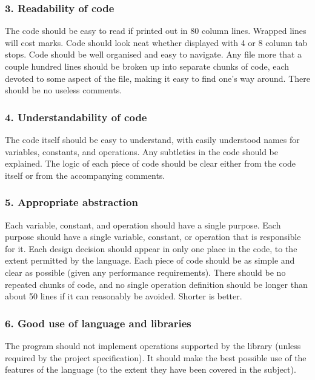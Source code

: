 \documentclass[a4paper]{article}
\begin{document}
\subsubsection*{3.  Readability of code}
The code should be easy to read if printed out in 80 column lines.
Wrapped lines will cost marks.
Code should look neat whether displayed with 4 or 8 column tab stops.
Code should be well organised and easy to navigate.
Any file more that a couple hundred lines should be broken up into
separate chunks of code, each devoted to some aspect of the file,
making it easy to find one's way around.
There should be no useless comments.

\subsubsection*{4.  Understandability of code}
The code itself should be easy to understand, with easily understood names
for variables, constants, and operations.
Any subtleties in the code should be explained.
The logic of each piece of code should be clear either from the code
itself or from the accompanying comments.

\subsubsection*{5.  Appropriate abstraction}
Each variable, constant, and operation should have
a single purpose.
Each purpose should have a single variable, constant, or
operation that is responsible for it.
Each design decision should appear in only one place in the code,
to the extent permitted by the language.
Each piece of code should be as simple and clear as possible
(given any performance requirements).
There should be no repeated chunks of code, and no single 
operation definition should be longer than about 50 lines if
it can reasonably be avoided.
Shorter is better.

\subsubsection*{6.  Good use of language and libraries}
The program should not implement operations supported by the library
(unless required by the project specification).
It should make the best possible use of the features of the
language (to the extent they have been covered in the subject).
\end{document}
